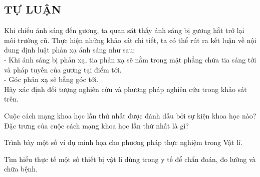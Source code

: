 \subsection{TỰ LUẬN}
\setcounter{ex}{0}
\begin{ex}
	Khi chiếu ánh sáng đến gương, ta quan sát thấy ánh sáng bị gương hắt trở lại môi trường cũ. Thực hiện những khảo sát chi tiết, ta có thể rút ra kết luận về nội dung định luật phản xạ ánh sáng như sau:\\
	-	Khi ánh sáng bị phản xạ, tia phản xạ sẽ nằm trong mặt phẳng chứa tia sáng tới và pháp tuyến của gương tại điểm tới.\\
	-	Góc phản xạ sẽ bằng góc tới.\\
	Hãy xác định đối tượng nghiên cứu và phương pháp nghiên cứu trong khảo sát trên.
\end{ex}
\begin{ex}
	Cuộc cách mạng khoa học lần thứ nhất được đánh dấu bởi sự kiện khoa học nào? Đặc trưng của cuộc cách mạng khoa học lần thứ nhất là gì?
\end{ex}
\begin{ex}
	Trình bày một số ví dụ minh họa cho phương pháp thực nghiệm trong Vật lí.
\end{ex}
\begin{ex}
	Tìm hiểu thực tế một số thiết bị vật lí dùng trong y tế để chẩn đoán, đo lường và chữa bệnh.
\end{ex}
